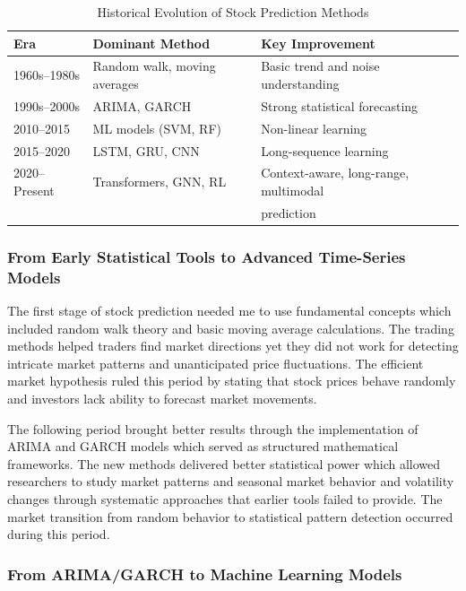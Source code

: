 \begin{table}[htbp]
\centering
\caption{Historical Evolution of Stock Prediction Methods}
\begin{tabular}{@{}lll@{}}
\toprule
\textbf{Era} & \textbf{Dominant Method} & \textbf{Key Improvement} \\ \midrule
1960s--1980s & Random walk, moving averages & Basic trend and noise understanding \\
1990s--2000s & ARIMA, GARCH & Strong statistical forecasting \\
2010--2015 & ML models (SVM, RF) & Non-linear learning \\
2015--2020 & LSTM, GRU, CNN & Long-sequence learning \\
2020--Present & Transformers, GNN, RL & Context-aware, long-range, multimodal \\ 
& & prediction \\ \bottomrule
\end{tabular}
\end{table}

\subsubsection{From Early Statistical Tools to Advanced Time-Series Models}

The first stage of stock prediction needed me to use fundamental concepts which included random walk theory and basic moving average calculations. The trading methods helped traders find market directions yet they did not work for detecting intricate market patterns and unanticipated price fluctuations. The efficient market hypothesis ruled this period by stating that stock prices behave randomly and investors lack ability to forecast market movements.

The following period brought better results through the implementation of ARIMA and GARCH models which served as structured mathematical frameworks. The new methods delivered better statistical power which allowed researchers to study market patterns and seasonal market behavior and volatility changes through systematic approaches that earlier tools failed to provide. The market transition from random behavior to statistical pattern detection occurred during this period.

\subsubsection{From ARIMA/GARCH to Machine Learning Models}

